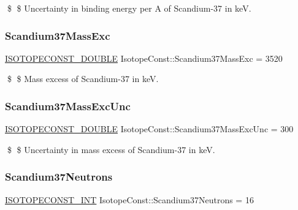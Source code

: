 \$ \$ Uncertainty in binding energy per A of Scandium-\/37 in keV. \mbox{\label{group___isotope_const-_scandium-_sc37_gadbcbe5695550bf916b54b101309291f2}} 
\subsubsection{\texorpdfstring{Scandium37\+Mass\+Exc}{Scandium37MassExc}}
{\footnotesize\ttfamily \mbox{\hyperlink{group___isotope_const-_macros_ga8f45a7272ce02c0b4c65c44636ed719a}{I\+S\+O\+T\+O\+P\+E\+C\+O\+N\+S\+T\+\_\+\+D\+O\+U\+B\+LE}} Isotope\+Const\+::\+Scandium37\+Mass\+Exc = 3520}

\$ \$ Mass excess of Scandium-\/37 in keV. \mbox{\label{group___isotope_const-_scandium-_sc37_ga6daf3b015372b70789671bd534ad0486}} 
\subsubsection{\texorpdfstring{Scandium37\+Mass\+Exc\+Unc}{Scandium37MassExcUnc}}
{\footnotesize\ttfamily \mbox{\hyperlink{group___isotope_const-_macros_ga8f45a7272ce02c0b4c65c44636ed719a}{I\+S\+O\+T\+O\+P\+E\+C\+O\+N\+S\+T\+\_\+\+D\+O\+U\+B\+LE}} Isotope\+Const\+::\+Scandium37\+Mass\+Exc\+Unc = 300}

\$ \$ Uncertainty in mass excess of Scandium-\/37 in keV. \mbox{\label{group___isotope_const-_scandium-_sc37_ga10ad7c128c0e0db0edc9da3318bac546}} 
\subsubsection{\texorpdfstring{Scandium37\+Neutrons}{Scandium37Neutrons}}
{\footnotesize\ttfamily \mbox{\hyperlink{group___isotope_const-_macros_ga5f18360b3e99483a35c32d789e62621c}{I\+S\+O\+T\+O\+P\+E\+C\+O\+N\+S\+T\+\_\+\+I\+NT}} Isotope\+Const\+::\+Scandium37\+Neutrons = 16}

